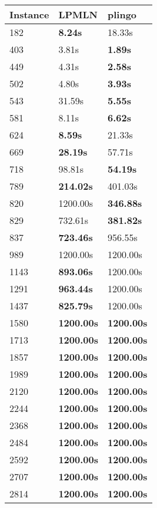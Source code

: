\begin{tabular}{|l|l|l|}
\toprule
\textbf{Instance} &    \textbf{LPMLN} &   \textbf{plingo} \\
\midrule
              182 &    \textbf{8.24s} &            18.33s \\
              403 &             3.81s &    \textbf{1.89s} \\
              449 &             4.31s &    \textbf{2.58s} \\
              502 &             4.80s &    \textbf{3.93s} \\
              543 &            31.59s &    \textbf{5.55s} \\
              581 &             8.11s &    \textbf{6.62s} \\
              624 &    \textbf{8.59s} &            21.33s \\
              669 &   \textbf{28.19s} &            57.71s \\
              718 &            98.81s &   \textbf{54.19s} \\
              789 &  \textbf{214.02s} &           401.03s \\
              820 &          1200.00s &  \textbf{346.88s} \\
              829 &           732.61s &  \textbf{381.82s} \\
              837 &  \textbf{723.46s} &           956.55s \\
              989 &          1200.00s &          1200.00s \\
             1143 &  \textbf{893.06s} &          1200.00s \\
             1291 &  \textbf{963.44s} &          1200.00s \\
             1437 &  \textbf{825.79s} &          1200.00s \\
             1580 & \textbf{1200.00s} & \textbf{1200.00s} \\
             1713 & \textbf{1200.00s} & \textbf{1200.00s} \\
             1857 & \textbf{1200.00s} & \textbf{1200.00s} \\
             1989 & \textbf{1200.00s} & \textbf{1200.00s} \\
             2120 & \textbf{1200.00s} & \textbf{1200.00s} \\
             2244 & \textbf{1200.00s} & \textbf{1200.00s} \\
             2368 & \textbf{1200.00s} & \textbf{1200.00s} \\
             2484 & \textbf{1200.00s} & \textbf{1200.00s} \\
             2592 & \textbf{1200.00s} & \textbf{1200.00s} \\
             2707 & \textbf{1200.00s} & \textbf{1200.00s} \\
             2814 & \textbf{1200.00s} & \textbf{1200.00s} \\
\bottomrule
\end{tabular}
